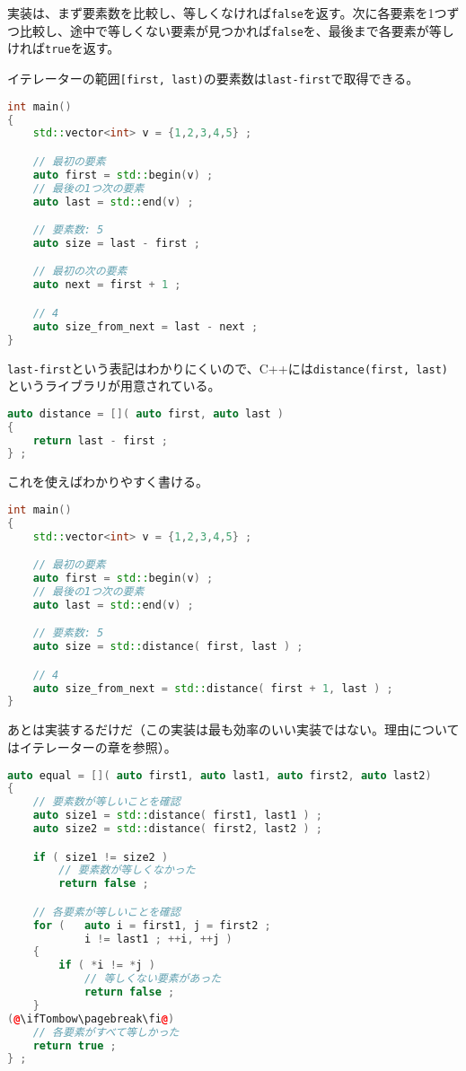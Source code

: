 実装は、まず要素数を比較し、等しくなければ\texttt{false}を返す。次に各要素を1つずつ比較し、途中で等しくない要素が見つかれば\texttt{false}を、最後まで各要素が等しければ\texttt{true}を返す。

イテレーターの範囲\texttt{[first, last)}の要素数は\texttt{last-first}で取得できる。

\begin{lstlisting}[language={C++}]
int main()
{
    std::vector<int> v = {1,2,3,4,5} ;

    // 最初の要素
    auto first = std::begin(v) ;
    // 最後の1つ次の要素
    auto last = std::end(v) ;

    // 要素数: 5
    auto size = last - first ;

    // 最初の次の要素
    auto next = first + 1 ;

    // 4
    auto size_from_next = last - next ;
}
\end{lstlisting}

\texttt{last-first}という表記はわかりにくいので、C++には\texttt{distance(first, last)}というライブラリが用意されている。

\ifTombow\pagebreak\fi
\begin{lstlisting}[language={C++}]
auto distance = []( auto first, auto last )
{
    return last - first ;
} ;
\end{lstlisting}

これを使えばわかりやすく書ける。

\begin{lstlisting}[language={C++}]
int main()
{
    std::vector<int> v = {1,2,3,4,5} ;

    // 最初の要素
    auto first = std::begin(v) ;
    // 最後の1つ次の要素
    auto last = std::end(v) ;

    // 要素数: 5
    auto size = std::distance( first, last ) ;

    // 4
    auto size_from_next = std::distance( first + 1, last ) ;
}
\end{lstlisting}

あとは実装するだけだ（この実装は最も効率のいい実装ではない。理由についてはイテレーターの章を参照）。

\begin{lstlisting}[language={C++}]
auto equal = []( auto first1, auto last1, auto first2, auto last2)
{
    // 要素数が等しいことを確認
    auto size1 = std::distance( first1, last1 ) ;
    auto size2 = std::distance( first2, last2 ) ;

    if ( size1 != size2 )
        // 要素数が等しくなかった
        return false ;

    // 各要素が等しいことを確認
    for (   auto i = first1, j = first2 ;
            i != last1 ; ++i, ++j )
    {
        if ( *i != *j )
            // 等しくない要素があった
            return false ;
    }
(@\ifTombow\pagebreak\fi@)
    // 各要素がすべて等しかった
    return true ;
} ;
\end{lstlisting}

